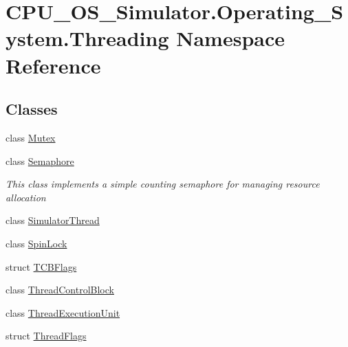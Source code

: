\hypertarget{namespace_c_p_u___o_s___simulator_1_1_operating___system_1_1_threading}{}\section{C\+P\+U\+\_\+\+O\+S\+\_\+\+Simulator.\+Operating\+\_\+\+System.\+Threading Namespace Reference}
\label{namespace_c_p_u___o_s___simulator_1_1_operating___system_1_1_threading}
\subsection*{Classes}
\begin{DoxyCompactItemize}
\item 
class \hyperlink{class_c_p_u___o_s___simulator_1_1_operating___system_1_1_threading_1_1_mutex}{Mutex}
\item 
class \hyperlink{class_c_p_u___o_s___simulator_1_1_operating___system_1_1_threading_1_1_semaphore}{Semaphore}
\begin{DoxyCompactList}\small\item\em This class implements a simple counting semaphore for managing resource allocation \end{DoxyCompactList}\item 
class \hyperlink{class_c_p_u___o_s___simulator_1_1_operating___system_1_1_threading_1_1_simulator_thread}{Simulator\+Thread}
\item 
class \hyperlink{class_c_p_u___o_s___simulator_1_1_operating___system_1_1_threading_1_1_spin_lock}{Spin\+Lock}
\item 
struct \hyperlink{struct_c_p_u___o_s___simulator_1_1_operating___system_1_1_threading_1_1_t_c_b_flags}{T\+C\+B\+Flags}
\item 
class \hyperlink{class_c_p_u___o_s___simulator_1_1_operating___system_1_1_threading_1_1_thread_control_block}{Thread\+Control\+Block}
\item 
class \hyperlink{class_c_p_u___o_s___simulator_1_1_operating___system_1_1_threading_1_1_thread_execution_unit}{Thread\+Execution\+Unit}
\item 
struct \hyperlink{struct_c_p_u___o_s___simulator_1_1_operating___system_1_1_threading_1_1_thread_flags}{Thread\+Flags}
\end{DoxyCompactItemize}
